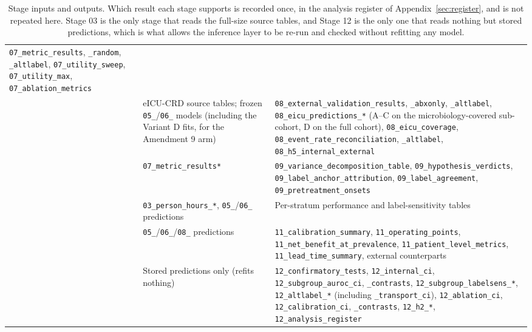 \begin{table}[H]
\begin{tabularx}{\textwidth}{p{0.9cm}p{4.2cm}X}
        \texttt{07\_metric\_results}, \texttt{\_random}, \texttt{\_altlabel},
        \texttt{07\_utility\_sweep}, \texttt{07\_utility\_max},
        \texttt{07\_ablation\_metrics} \\
        \addlinespace
        08 & eICU-CRD source tables; frozen \texttt{05\_}/\texttt{06\_} models
        (including the Variant D fits, for the Amendment 9 arm) &
        \texttt{08\_external\_validation\_results}, \texttt{\_abxonly},
        \texttt{\_altlabel}, \texttt{08\_eicu\_predictions\_*} (A--C on the
        microbiology-covered sub-cohort, D on the full cohort),
        \texttt{08\_eicu\_coverage},
        \texttt{08\_event\_rate\_reconciliation}, \texttt{\_altlabel},
        \texttt{08\_h5\_internal\_external} \\
        \addlinespace
        09 & \texttt{07\_metric\_results*} &
        \texttt{09\_variance\_decomposition\_table},
        \texttt{09\_hypothesis\_verdicts},
        \texttt{09\_label\_anchor\_attribution},
        \texttt{09\_label\_agreement}, \texttt{09\_pretreatment\_onsets} \\
        \addlinespace
        10 & \texttt{03\_person\_hours\_*}, \texttt{05\_}/\texttt{06\_}
        predictions &
        Per-stratum performance and label-sensitivity tables \\
        \addlinespace
        11 & \texttt{05\_}/\texttt{06\_}/\texttt{08\_} predictions &
        \texttt{11\_calibration\_summary}, \texttt{11\_operating\_points},
        \texttt{11\_net\_benefit\_at\_prevalence},
        \texttt{11\_patient\_level\_metrics},
        \texttt{11\_lead\_time\_summary}, external counterparts \\
        \addlinespace
        12 & Stored predictions only (refits nothing) &
        \texttt{12\_confirmatory\_tests}, \texttt{12\_internal\_ci},
        \texttt{12\_subgroup\_auroc\_ci}, \texttt{\_contrasts},
        \texttt{12\_subgroup\_labelsens\_*}, \texttt{12\_altlabel\_*}
        (including \texttt{\_transport\_ci}),
        \texttt{12\_ablation\_ci}, \texttt{12\_calibration\_ci},
        \texttt{\_contrasts},
        \texttt{12\_h2\_*}, \texttt{12\_analysis\_register} \\
        \bottomrule
    \end{tabularx}
    \caption{Stage inputs and outputs. Which result each stage supports is
    recorded once, in the analysis register of
    Appendix~\ref{sec:register}, and is not repeated here. Stage 03 is
    the only stage that reads the full-size source tables, and Stage 12 is the
    only one that reads nothing but stored predictions, which is what allows
    the inference layer to be re-run and checked without refitting any model.}
    \label{tab:stage_reference}
\end{table}

